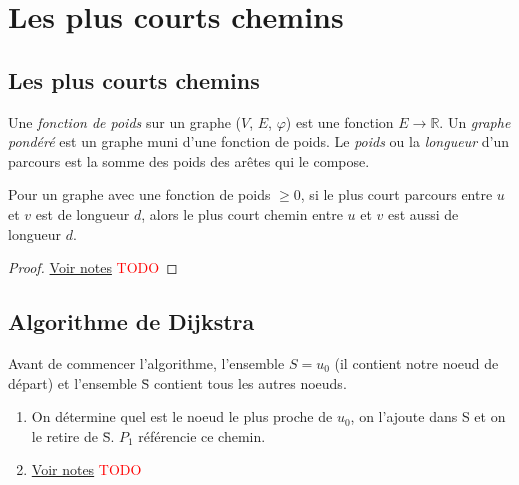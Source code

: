 \section{Les plus courts chemins}
\subsection{Les plus courts chemins}
\begin{mydef}
  Une \emph{fonction de poids} sur un graphe ($V$, $E$, $\varphi$) est une fonction $E \to \mathbb{R}$. Un \emph{graphe pondéré} est un graphe muni d’une fonction de poids. Le \emph{poids} ou la \emph{longueur} d’un parcours est la somme des poids des arêtes qui le compose.
\end{mydef}

\begin{mytheo} 
  Pour un graphe avec une fonction de poids $\geq 0$, si le plus court parcours entre $u$ et $v$ est de longueur $d$, alors le plus court chemin entre $u$ et $v$ est aussi de longueur $d$.
  \begin{proof}
     \href{https://dl.dropboxusercontent.com/u/44092863/Graph_Theory_Romain_Capron.pdf}{Voir notes} \textcolor{red}{TODO}
  \end{proof}
\end{mytheo}

\subsection{Algorithme de Dijkstra}
\begin{myalgo}
  Avant de commencer l'algorithme, l'ensemble $S={u_{0}}$ (il contient notre noeud de départ) et l'ensemble \={S} contient tous les autres noeuds.
  \begin{enumerate}
	\item On détermine quel est le noeud le plus proche de $u_{0}$, on l'ajoute dans S et on le retire de \={S}. $P_{1}$ référencie ce chemin.
	\item \href{https://dl.dropboxusercontent.com/u/44092863/Graph_Theory_Romain_Capron.pdf}{Voir notes} \textcolor{red}{TODO}
	\end{enumerate}
\end{myalgo}

